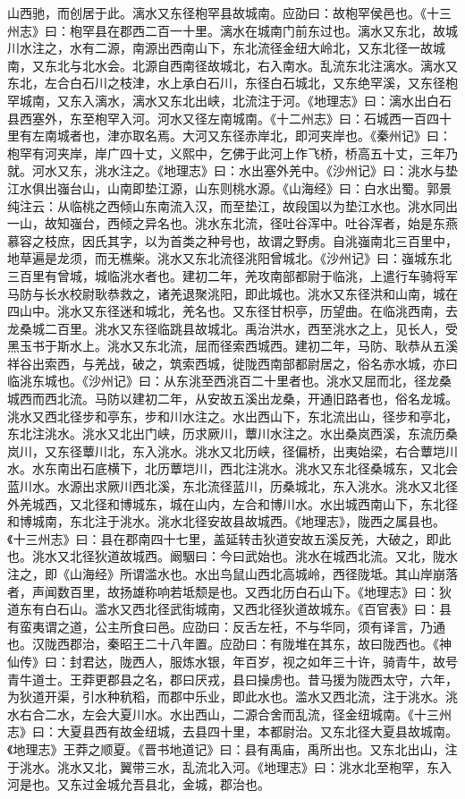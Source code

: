\documentclass[12pt,UTF8]{ctexbook}
\begin{document}
山西驰，而创居于此。漓水又东径枹罕县故城南。应劭曰：故枹罕侯邑也。《十三州志》曰：枹罕县在郡西二百一十里。漓水在城南门前东过也。漓水又东北，故城川水注之，水有二源，南源出西南山下，东北流径金纽大岭北，又东北径一故城南，又东北与北水会。北源自西南径故城北，右入南水。乱流东北注漓水。漓水又东北，左合白石川之枝津，水上承白石川，东径白石城北，又东绝罕溪，又东径枹罕城南，又东入漓水，漓水又东北出峡，北流注于河。《地理志》曰：漓水出白石县西塞外，东至枹罕入河。河水又径左南城南。《十二州志》曰：石城西一百四十里有左南城者也，津亦取名焉。大河又东径赤岸北，即河夹岸也。《秦州记》曰：枹罕有河夹岸，岸广四十丈，义熙中，乞佛于此河上作飞桥，桥高五十丈，三年乃就。河水又东，洮水注之。《地理志》曰：水出塞外羌中。《沙州记》曰：洮水与垫江水俱出嵹台山，山南即垫江源，山东则桃水源。《山海经》曰：白水出蜀。郭景纯注云：从临桃之西倾山东南流入汉，而至垫江，故段国以为垫江水也。洮水同出一山，故知嵹台，西倾之异名也。洮水东北流，径吐谷浑中。吐谷浑者，始是东燕慕容之枝庶，因氏其字，以为首类之种号也，故谓之野虏。自洮嵹南北三百里中，地草遍是龙须，而无樵柴。洮水又东北流径洮阳曾城北。《沙州记》曰：嵹城东北三百里有曾城，城临洮水者也。建初二年，羌攻南部都尉于临洮，上遣行车骑将军马防与长水校尉耿恭救之，诸羌退聚洮阳，即此城也。洮水又东径洪和山南，城在四山中。洮水又东径迷和城北，羌名也。又东径甘枳亭，历望曲。在临洮西南，去龙桑城二百里。洮水又东径临跳县故城北。禹治洪水，西至洮水之上，见长人，受黑玉书于斯水上。洮水又东北流，屈而径索西城西。建初二年，马防、耿恭从五溪祥谷出索西，与羌战，破之，筑索西城，徙陇西南部都尉居之，俗名赤水城，亦曰临洮东城也。《沙州记》曰：从东洮至西洮百二十里者也。洮水又屈而北，径龙桑城西而西北流。马防以建初二年，从安故五溪出龙桑，开通旧路者也，俗名龙城。洮水又西北径步和亭东，步和川水注之。水出西山下，东北流出山，径步和亭北，东北注洮水。洮水又北出门峡，历求厥川，蕈川水注之。水出桑岚西溪，东流历桑岚川，又东径蕈川北，东入洮水。洮水又北历峡，径偏桥，出夷始梁，右合蕈垲川水。水东南出石底横下，北历蕈垲川，西北注洮水。洮水又东北径桑城东，又北会蓝川水。水源出求厥川西北溪，东北流径蓝川，历桑城北，东入洮水。洮水又北径外羌城西，又北径和博城东，城在山内，左合和博川水。水出城西南山下，东北径和博城南，东北注于洮水。洮水北径安故县故城西。《地理志》，陇西之属县也。《十三州志》曰：县在郡南四十七里，盖延转击狄道安故五溪反羌，大破之，即此也。洮水又北径狄道故城西。阚駰曰：今曰武始也。洮水在城西北流。又北，陇水注之，即《山海经》所谓滥水也。水出鸟鼠山西北高城岭，西径陇坻。其山岸崩落者，声闻数百里，故扬雄称响若坻颓是也。又西北历白石山下。《地理志》曰：狄道东有白石山。滥水又西北径武街城南，又西北径狄道故城东。《百官表》曰：县有蛮夷谓之道，公主所食曰邑。应劭曰：反舌左衽，不与华同，须有译言，乃通也。汉陇西郡治，秦昭王二十八年置。应劭曰：有陇堆在其东，故曰陇西也。《神仙传》曰：封君达，陇西人，服炼水银，年百岁，视之如年三十许，骑青牛，故号青牛道士。王莽更郡县之名，郡曰厌戎，县曰操虏也。昔马援为陇西太守，六年，为狄道开渠，引水种秔稻，而郡中乐业，即此水也。滥水又西北流，注于洮水。洮水右合二水，左会大夏川水。水出西山，二源合舍而乱流，径金纽城南。《十三州志》曰：大夏县西有故金纽城，去县四十里，本都尉治。又东北径大夏县故城南。《地理志》王莽之顺夏。《晋书地道记》曰：县有禹庙，禹所出也。又东北出山，注于洮水。洮水又北，翼带三水，乱流北入河。《地理志》曰：洮水北至枹罕，东入河是也。又东过金城允吾县北，金城，郡治也。
\end{document}
